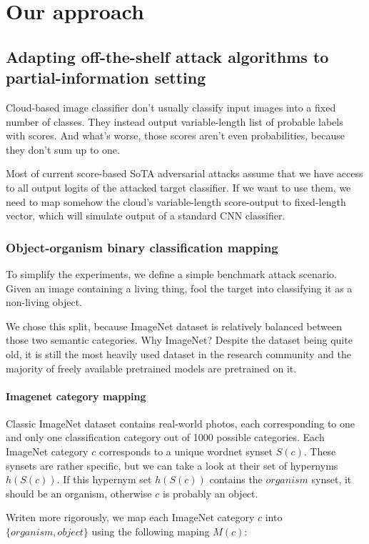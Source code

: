 \chapter{Our approach}

\section{Adapting off-the-shelf attack algorithms to partial-information setting}
Cloud-based image classifier don't usually classify input images into a fixed number of classes. They instead output variable-length list of probable labels with scores. And what's worse, those scores aren't even probabilities, because they don't sum up to one. 

Most of current score-based SoTA adversarial attacks assume that we have access to all output logits of the attacked target classifier. If we want to use them, we need to map somehow the cloud's variable-length score-output to fixed-length vector, which will simulate output of a standard CNN classifier.

\subsection{Object-organism binary classification mapping}
To simplify the experiments, we define a simple benchmark attack scenario. Given an image containing a living thing, fool the target into classifying it as a non-living object.

We chose this split, because ImageNet dataset is relatively balanced between those two semantic categories. Why ImageNet? Despite the dataset being quite old, it is still the most heavily used dataset in the research community and the majority of freely available pretrained models are pretrained on it.

\subsubsection{Imagenet category mapping}
Classic ImageNet dataset contains real-world photos, each corresponding to one and only one classification category out of 1000 possible categories. Each ImageNet category $c$ corresponds to a unique wordnet synset $S(c)$. These synsets are rather specific, but we can take a look at their set of hypernyms $h(S(c))$. If this hypernym set $h(S(c))$ contains the $organism$ synset, it should be an organism, otherwise $c$ is probably an object. 

Writen more rigorously, we map each ImageNet category $c$ into $\{organism, object\}$ using the following maping $M(c)$:

